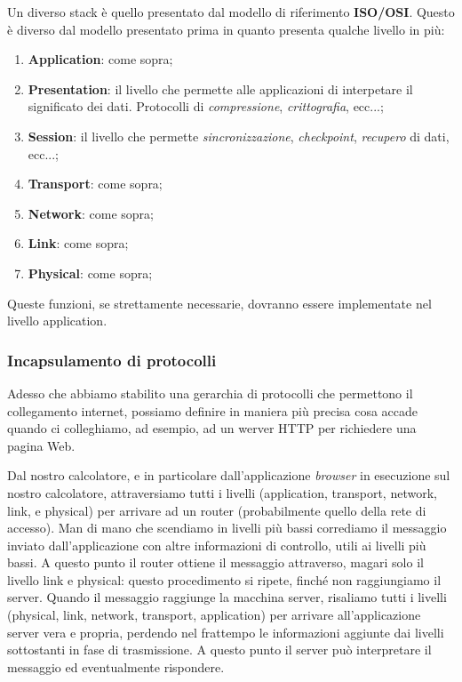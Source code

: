 \documentclass[a4paper,11pt]{article}
\begin{document}
Un diverso stack è quello presentato dal modello di riferimento \textbf{ISO/OSI}. Questo è diverso dal modello presentato prima in quanto presenta qualche livello in più:
\begin{enumerate}
	\item \textbf{Application}: come sopra;
	\item \textbf{Presentation}: il livello che permette alle applicazioni di interpetare il significato dei dati. Protocolli di \textit{compressione}, \textit{crittografia}, ecc...;
	\item \textbf{Session}: il livello che permette \textit{sincronizzazione}, \textit{checkpoint}, \textit{recupero} di dati, ecc...;
	\item \textbf{Transport}: come sopra;
	\item \textbf{Network}: come sopra;
	\item \textbf{Link}: come sopra;
	\item \textbf{Physical}: come sopra;
\end{enumerate}

Queste funzioni, se strettamente necessarie, dovranno essere implementate nel livello application.

\subsubsection{Incapsulamento di protocolli}
Adesso che abbiamo stabilito una gerarchia di protocolli che permettono il collegamento internet, possiamo definire in maniera più precisa cosa accade quando ci colleghiamo, ad esempio, ad un werver HTTP per richiedere una pagina Web.

Dal nostro calcolatore, e in particolare dall'applicazione \textit{browser} in esecuzione sul nostro calcolatore, attraversiamo tutti i livelli (application, transport, network, link, e physical) per arrivare ad un router (probabilmente quello della rete di accesso). Man di mano che scendiamo in livelli più bassi corrediamo il messaggio inviato dall'applicazione con altre informazioni di controllo, utili ai livelli più bassi.
A questo punto il router ottiene il messaggio attraverso, magari solo il livello link e physical: questo procedimento si ripete, finché non raggiungiamo il server.
Quando il messaggio raggiunge la macchina server, risaliamo tutti i livelli (physical, link, network, transport, application) per arrivare all'applicazione server vera e propria, perdendo nel frattempo le informazioni aggiunte dai livelli sottostanti in fase di trasmissione.
A questo punto il server può interpretare il messaggio ed eventualmente rispondere.
\end{document}
